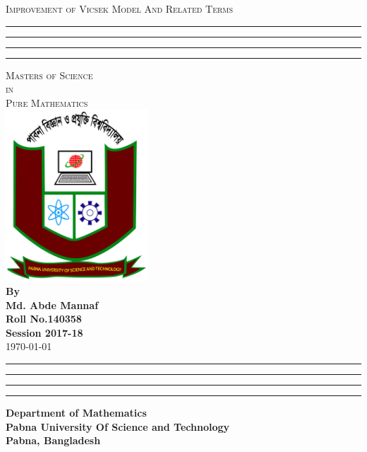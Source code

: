 \thispagestyle{empty}
\begin{center}

\textsc{\LARGE Improvement of Vicsek Model And Related Terms}\\









\vspace{1cm}
\hrule\hrule\hrule\hrule
\vspace{1cm}
\textsc{Masters of Science
\\
in\\
Pure Mathematics}\\
\vspace{1cm}
\includegraphics[width=0.4\textwidth]{Images/pust_logo.jpg}
\vspace{1cm}
\\
\textbf{
By\\
Md. Abde Mannaf\\
Roll No.140358\\
Session 2017-18}\\
\vspace*{1\baselineskip} 
\today
\vspace{1.5cm}
\hrule\hrule\hrule\hrule
\textbf{
Department of Mathematics\\
Pabna University Of Science and Technology\\
Pabna, Bangladesh}


\end{center}
\clearpage
